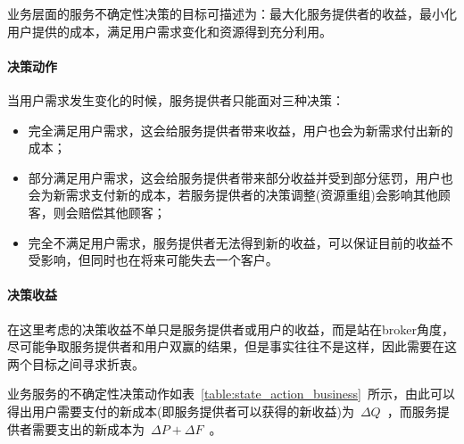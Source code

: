 业务层面的服务不确定性决策的目标可描述为：最大化服务提供者的收益，最小化用户提供的成本，满足用户需求变化和资源得到充分利用。

\setcounter{paragraph}{0}
\paragraph{决策动作}

当用户需求发生变化的时候，服务提供者只能面对三种决策：

\begin{itemize}

\item 
完全满足用户需求，这会给服务提供者带来收益，用户也会为新需求付出新的成本；

\item 部分满足用户需求，这会给服务提供者带来部分收益并受到部分惩罚，用户也会为新需求支付新的成本，若服务提供者的决策调整(资源重组)会影响其他顾客，则会赔偿其他顾客；

\item 完全不满足用户需求，服务提供者无法得到新的收益，可以保证目前的收益不受影响，但同时也在将来可能失去一个客户。

\end{itemize}

\paragraph{决策收益}

在这里考虑的决策收益不单只是服务提供者或用户的收益，而是站在broker角度，尽可能争取服务提供者和用户双赢的结果，但是事实往往不是这样，因此需要在这两个目标之间寻求折衷。

业务服务的不确定性决策动作如表~\ref{table:state_action_business}~所示，由此可以得出用户需要支付的新成本(即服务提供者可以获得的新收益)为~$\Delta Q$~，而服务提供者需要支出的新成本为~$\Delta P + \Delta F$~。

